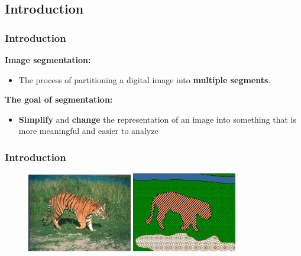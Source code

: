 \documentclass[notheorems,mathserif,table,compress]{beamer}  %
\begin{document}
\subsection{Introduction}
\begin{frame}
    \frametitle{Introduction}
    \textbf{Image segmentation:} 
	\begin{itemize}
	\item The process of partitioning a digital image into \textbf{multiple segments}.\newline
	\end{itemize}
    \textbf{The goal of segmentation:}
	\begin{itemize}
	\item \textbf{Simplify} and \textbf{change} the representation of an image into something that is more meaningful and easier to analyze 
	\end{itemize}
\end{frame}


\begin{frame}
    \frametitle{Introduction}
   \begin{figure}
   \begin{minipage}[t]{0.4\textwidth}
   \centering
   \includegraphics[width=1.8in]{tiger1.png}
   \end{minipage}
   \begin{minipage}[t]{0.4\textwidth}
   \centering
   \includegraphics[width=1.8in]{tiger2.png}
   \end{minipage} 
   \end{figure}
\end{frame}
\end{document}
